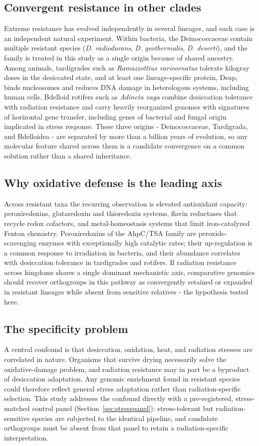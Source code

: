 \subsection{Convergent resistance in other clades}
Extreme resistance has evolved independently in several lineages, and each
case is an independent natural experiment. Within bacteria, the
Deinococcaceae contain multiple resistant species (\emph{D. radiodurans},
\emph{D. geothermalis}, \emph{D. deserti}), and the family is treated in
this study as a single origin because of shared ancestry. Among animals,
tardigrades such as \emph{Ramazzottius varieornatus} tolerate kilogray
doses in the desiccated state, and at least one lineage-specific protein,
Dsup, binds nucleosomes and reduces DNA damage in heterologous systems,
including human cells. Bdelloid rotifers such as \emph{Adineta vaga}
combine desiccation tolerance with radiation resistance and carry heavily
reorganized genomes with signatures of horizontal gene transfer, including
genes of bacterial and fungal origin implicated in stress response. These
three origins - Deinococcaceae, Tardigrada, and Bdelloidea - are separated
by more than a billion years of evolution, so any molecular feature shared
across them is a candidate convergence on a common solution rather than a
shared inheritance.

\subsection{Why oxidative defense is the leading axis}
Across resistant taxa the recurring observation is elevated antioxidant
capacity: peroxiredoxins, glutaredoxin and thioredoxin systems, flavin
reductases that recycle redox cofactors, and metal-homeostasis systems
that limit iron-catalyzed Fenton chemistry. Peroxiredoxins of the
AhpC/TSA family are peroxide-scavenging enzymes with exceptionally high
catalytic rates; their up-regulation is a common response to irradiation
in bacteria, and their abundance correlates with desiccation tolerance in
tardigrades and rotifers. If radiation resistance across kingdoms shares a
single dominant mechanistic axis, comparative genomics should recover
orthogroups in this pathway as convergently retained or expanded in
resistant lineages while absent from sensitive relatives - the hypothesis
tested here.

\subsection{The specificity problem}
A central confound is that desiccation, oxidation, heat, and radiation
stresses are correlated in nature. Organisms that survive drying
necessarily solve the oxidative-damage problem, and radiation resistance
may in part be a byproduct of desiccation adaptation. Any genomic
enrichment found in resistant species could therefore reflect general
stress adaptation rather than radiation-specific selection. This study
addresses the confound directly with a pre-registered, stress-matched
control panel (Section~\ref{sec:stresspanel}): stress-tolerant but
radiation-sensitive species are subjected to the identical pipeline, and
candidate orthogroups must be absent from that panel to retain a
radiation-specific interpretation.

